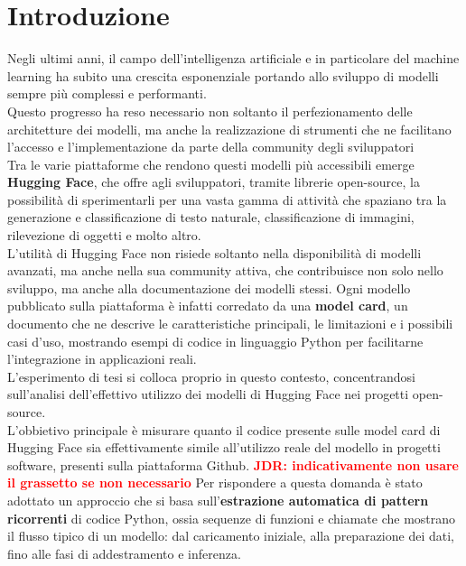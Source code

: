 \documentclass{article}
\newcommand{\JDR}[1]{\textbf{\textcolor{red}{JDR: {#1}}}}
\begin{document}
\section{Introduzione}
Negli ultimi anni, il campo dell'intelligenza artificiale e in particolare del machine learning ha subito una crescita esponenziale portando allo sviluppo di modelli sempre più complessi e performanti.\\
Questo progresso ha reso necessario non soltanto il perfezionamento delle architetture dei modelli, ma anche la realizzazione di strumenti che ne facilitano l'accesso e l'implementazione da parte della community degli sviluppatori\\
Tra le varie piattaforme che rendono questi modelli più accessibili emerge \textbf{Hugging Face}\cite{huggingface}, che offre agli sviluppatori, tramite librerie open-source, la possibilità di sperimentarli per una vasta gamma di attività che spaziano tra la generazione e classificazione di testo naturale, classificazione di immagini, rilevezione di oggetti e molto altro.\\
L'utilità di Hugging Face non risiede soltanto nella disponibilità di modelli avanzati, ma anche nella sua community attiva, che contribuisce non solo nello sviluppo, ma anche alla documentazione dei modelli stessi. Ogni modello pubblicato sulla piattaforma è infatti corredato da una \textbf{model card}, un documento che ne descrive le caratteristiche principali, le limitazioni e i possibili casi d’uso, mostrando esempi di codice in linguaggio Python per facilitarne l’integrazione in applicazioni reali.\\
L'esperimento di tesi si colloca proprio in questo contesto, concentrandosi sull’analisi dell’effettivo utilizzo dei modelli di Hugging Face nei progetti open-source.\\
L'obbietivo principale è misurare quanto il codice presente sulle model card di Hugging Face sia effettivamente simile all'utilizzo reale del modello in progetti software, presenti sulla piattaforma Github. \JDR{indicativamente non usare il grassetto se non necessario} Per rispondere a questa domanda è stato adottato un approccio che si basa sull'\textbf{estrazione automatica di pattern ricorrenti} di codice Python, ossia sequenze di funzioni e chiamate che mostrano il flusso tipico di un modello: dal caricamento iniziale, alla preparazione dei dati, fino alle fasi di addestramento e inferenza.\\
\end{document}
